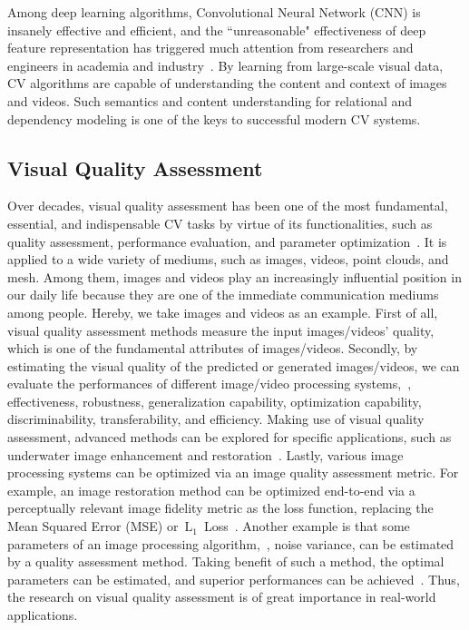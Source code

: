 	Among deep learning algorithms, Convolutional Neural Network (CNN) is insanely effective and efficient, and the ``unreasonable" effectiveness of deep feature representation has triggered much attention from researchers and engineers in academia and industry~\citep{lecun1998gradient, zhang2018unreasonable, SimonyanZ14a, ding2021comparison, dingIQA}. By learning from large-scale visual data, CV algorithms are capable of understanding the content and context of images and videos. Such semantics and content understanding for relational and dependency modeling is one of the keys to successful modern CV systems.
	
	\subsection{Visual Quality Assessment}
	Over decades, visual quality assessment has been one of the most fundamental, essential, and indispensable CV tasks by virtue of its functionalities, such as quality assessment, performance evaluation, and parameter optimization~\citep{ding2021comparison}. It is applied to a wide variety of mediums, such as images, videos, point clouds, and mesh. Among them, images and videos play an increasingly influential position in our daily life because they are one of the immediate communication mediums among people. Hereby, we take images and videos as an example. First of all, visual quality assessment methods measure the input images/videos' quality, which is one of the fundamental attributes of images/videos. Secondly, by estimating the visual quality of the predicted or generated images/videos, we can evaluate the performances of different image/video processing systems,~\eg, effectiveness, robustness, generalization capability, optimization capability, discriminability, transferability, and efficiency. Making use of visual quality assessment, advanced methods can be explored for specific applications, such as underwater image enhancement and restoration~\citep{GuoTMM}. Lastly, various image processing systems can be optimized via an image quality assessment metric. For example, an image restoration method can be optimized end-to-end via a perceptually relevant image fidelity metric as the loss function, replacing the Mean Squared Error (MSE) or~$\mathrm{L_1}$~Loss~\citep{ding2021comparison}. Another example is that some parameters of an image processing algorithm,~\eg, noise variance, can be estimated by a quality assessment method. Taking benefit of such a method, the optimal parameters can be estimated, and superior performances can be achieved~\citep{mittal2012no, zhu2010automatic}. Thus, the research on visual quality assessment is of great importance in real-world applications.
	
